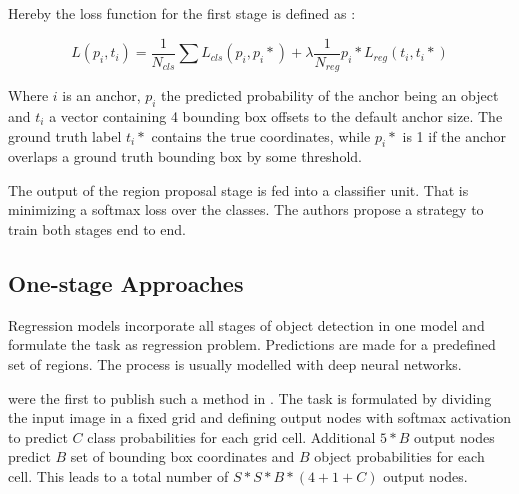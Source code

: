 	Hereby the loss function for the first stage is defined as \cite{Ren}:
	
	$$ 
	L({p_i},{t_i}) = \frac{1}{N_{cls}} \sum L_{cls}(p_i,p_i*) + \lambda \frac{1}{N_{reg}} p_i* L_{reg}(t_i,t_i*) 
	$$
	
	Where $i$ is an anchor, $p_i$ the predicted probability of the anchor being an object and $t_i$ a vector containing 4 bounding box offsets to the default anchor size. The ground truth label $t_i*$ contains the true coordinates, while $p_i*$ is 1 if the anchor overlaps a ground truth bounding box by some threshold. 
	
	The output of the region proposal stage is fed into a classifier unit. That is minimizing a softmax loss over the classes. The authors propose a strategy to train both stages end to end.
	
	\subsection{One-stage Approaches}
	

	Regression models incorporate all stages of object detection in one model and formulate the task as regression problem. Predictions are made for a predefined set of regions. The process is usually modelled with deep neural networks.
	
	\citeauthor{Redmon} were the first to publish such a method in \cite{Redmon}. The task is formulated by dividing the input image in a fixed grid and defining output nodes with softmax activation to predict $C$ class probabilities for each grid cell. Additional $5*B$ output nodes predict $B$ set of bounding box coordinates and $B$ object probabilities for each cell. This leads to a total number of $S*S*B*(4 + 1 + C)$ output nodes. 
	
